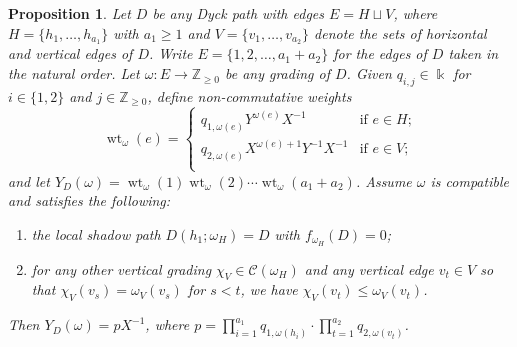 \documentclass[10pt]{amsart}
\newtheorem{proposition}[theorem]{Proposition}
\theoremstyle{definition}
\newcommand{\cC}{\mathcal{C}}
\newcommand{\kk}{\Bbbk}
\newcommand{\ZZ}{\mathbb{Z}}
\DeclareMathOperator{\wt}{wt}
\begin{document}
\begin{proposition}
 \label{prop:noncommutative collapse}
 Let $D$ be any Dyck path with edges $E=H\sqcup V$, where $H=\{h_1,\ldots,h_{a_1}\}$ with $a_1\ge1$ and $V=\{v_1,\ldots,v_{a_2}\}$ denote the sets of horizontal and vertical edges of $D$. 
 Write $E=\{1,2,\ldots,a_1+a_2\}$ for the edges of $D$ taken in the natural order.
 Let $\omega:E\to\ZZ_{\ge0}$ be any grading of $D$.
 Given $q_{i,j}\in\kk$ for $i\in\{1,2\}$ and $j\in\ZZ_{\ge0}$, define non-commutative weights
 \begin{equation}
 \label{eq:general edge weights}
 \wt_\omega(e)=\begin{cases}
 q_{1,\omega(e)}Y^{\omega(e)}X^{-1} & \text{if $e\in H$;}\\
 q_{2,\omega(e)}X^{\omega(e)+1}Y^{-1}X^{-1} & \text{if $e\in V$;}\\
 \end{cases}
 \end{equation}
 and let $Y_D(\omega)=\wt_\omega(1)\wt_\omega(2)\cdots\wt_\omega(a_1+a_2)$.
 Assume $\omega$ is compatible and satisfies the following:
 \begin{enumerate}
 \item\label{prop4.1_1} the local shadow path $D(h_1;\omega_H)=D$ with $f_{\omega_H}(D)=0$;
 \item\label{prop4.1_2} for any other vertical grading $\chi_V\in\cC(\omega_H)$ and any vertical edge $v_t\in V$ so that $\chi_V(v_s)=\omega_V(v_s)$ for $s<t$, we have $\chi_V(v_t)\le\omega_V(v_t)$.
 \end{enumerate}
 Then $Y_D(\omega)=pX^{-1}$, where $p=\prod_{i=1}^{a_1}q_{1,\omega(h_i)}\cdot\prod_{t=1}^{a_2}q_{2,\omega(v_t)}$.
\end{proposition}
\end{document}
